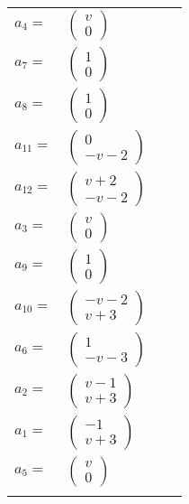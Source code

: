\documentclass[1p]{elsarticle_modified}
\theoremstyle{definition}
\begin{document}
\begin{tabular}{m{7pt} m{180pt} m{7pt} m{180pt} }
\flushright $a_{4}=$&$\begin{pmatrix}v\\0\end{pmatrix}$ \\
\flushright $a_{7}=$&$\begin{pmatrix}1\\0\end{pmatrix}$ \\
\flushright $a_{8}=$&$\begin{pmatrix}1\\0\end{pmatrix}$ \\
\flushright $a_{11}=$&$\begin{pmatrix}0\\- v-2\end{pmatrix}$ \\
\flushright $a_{12}=$&$\begin{pmatrix}v+2\\- v-2\end{pmatrix}$ \\
\flushright $a_{3}=$&$\begin{pmatrix}v\\0\end{pmatrix}$ \\
\flushright $a_{9}=$&$\begin{pmatrix}1\\0\end{pmatrix}$ \\
\flushright $a_{10}=$&$\begin{pmatrix}- v-2\\v+3\end{pmatrix}$ \\
\flushright $a_{6}=$&$\begin{pmatrix}1\\- v-3\end{pmatrix}$ \\
\flushright $a_{2}=$&$\begin{pmatrix}v-1\\v+3\end{pmatrix}$ \\
\flushright $a_{1}=$&$\begin{pmatrix}-1\\v+3\end{pmatrix}$ \\
\flushright $a_{5}=$&$\begin{pmatrix}v\\0\end{pmatrix}$\\&\end{tabular}
\end{document}
